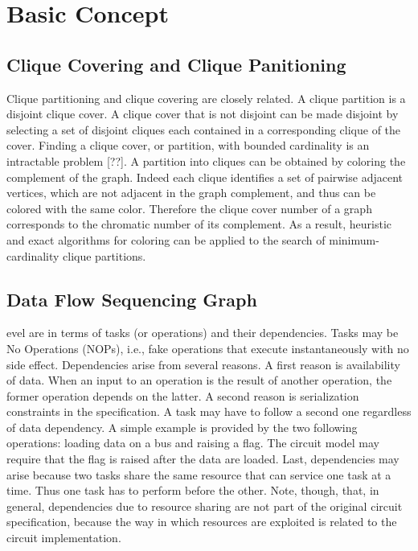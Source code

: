 \section{Basic Concept}


\subsection{Clique Covering and Clique Panitioning}

Clique partitioning and clique covering are closely related. A clique partition is a disjoint clique cover. A clique cover that is not disjoint can be made disjoint by selecting a set of disjoint cliques each contained in a corresponding clique of the cover. Finding a clique cover, or partition, with bounded cardinality is an intractable problem [??]. 
A partition into cliques can be obtained by coloring the complement of the graph. Indeed each clique identifies a set of pairwise adjacent vertices, which are not adjacent in the graph complement, and thus can be colored with the same color. Therefore the clique cover number of a graph corresponds to the chromatic number of its complement. As a result, heuristic and exact algorithms for coloring can be applied to the search of minimum-cardinality clique partitions. 

\subsection{Data Flow Sequencing Graph}

evel are in terms of tasks (or operations) and their dependencies. Tasks may be No Operations (NOPs), i.e., fake operations that execute instantaneously with no side effect. Dependencies arise from several reasons. A first reason is availability of data. When an input to an operation is the result of another operation, the former operation depends on the latter. A second reason is serialization constraints in the specification. A task may have to follow a second one regardless of data dependency. A simple example is provided by the two following operations: loading data on a bus and raising a flag. The circuit model may require that the flag is raised after the data are loaded. Last, dependencies may arise because two tasks share the same resource that can service one task at a time. Thus one task has to perform before the other. Note, though, that, in general, dependencies due to resource sharing are not part of the original circuit specification, because the way in which resources are exploited is related to the circuit implementation. 

